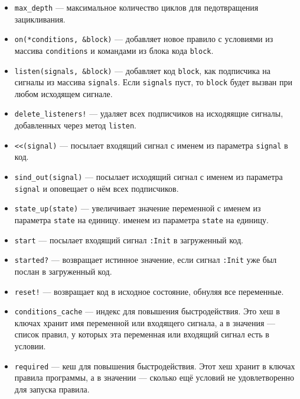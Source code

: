 \documentclass[utf8,a5paper,portrait,10pt,twoside]{eskdtext}
\begin{document}
\begin{itemize}
\begin{itemize}
          \item \texttt{max\_depth} — максимальное количество циклов для
                педотвращения зацикливания.
          \item \texttt{on(*conditions, \&block)} — добавляет новое правило
                с условиями из массива \texttt{conditions} и командами из блока
                кода \texttt{block}.
          \item \texttt{listen(signals, \&block)} — добавляет код
                \texttt{block}, как подписчика на сигналы из массива
                \texttt{signals}. Если \texttt{signals} пуст, то \texttt{block}
                будет вызван при любом исходящем сигнале.
          \item \texttt{delete\_listeners!} — удаляет всех подписчиков на
                исходяящие сигналы, добавленных через метод \texttt{listen}.
          \item \texttt{<<(signal)} — посылает входящий сигнал с именем
                из параметра \texttt{signal} в код.
          \item \texttt{sind\_out(signal)} — посылает исходящий сигнал с именем
                из параметра \texttt{signal} и оповещает о нём всех подписчиков.
          \item \texttt{state\_up(state)} — увеличивает значение переменной с
                именем из параметра \texttt{state} на единицу.
                именем из параметра \texttt{state} на единицу.
          \item \texttt{start} — посылает входящий сигнал \texttt{:Init} в
                загруженный код.
          \item \texttt{started?} — возвращает истинное значение, если сигнал
                \texttt{:Init} уже был послан в загруженный код.
          \item \texttt{reset!} — возвращает код в исходное состояние, обнуляя
                все переменные.
          \item \texttt{conditions\_cache} — индекс для повышения
                быстродействия. Это хеш в ключах хранит имя переменной или
                входящего сигнала, а в значения — список правил, у которых эта
                переменная или входящий сигнал есть в условии.
          \item \texttt{required} — кеш для повышения быстродействия. Этот хеш
                хранит в ключах правила программы, а в значении — сколько ещё
                условий не удовлетворенно для запуска правила.
        \end{itemize}

\end{itemize}
\end{document}
